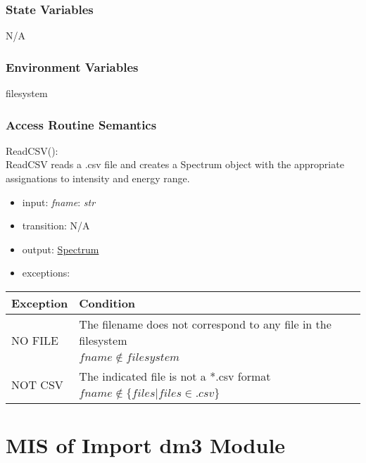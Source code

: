 \documentclass[12pt, titlepage]{article}
\begin{document}
\subsubsection{State Variables}
N/A

\subsubsection{Environment Variables}
filesystem 

\subsubsection{Access Routine Semantics}

\noindent ReadCSV():\\
ReadCSV reads a .csv file and creates a Spectrum object with the appropriate
assignations to intensity and energy range.
\begin{itemize}
    \item input: \textit{fname}: \textit{str}
    \item transition: N/A 
    \item output: \hyperref[Mod:Spectrum]{Spectrum} 
    \item exceptions:
\end{itemize}
\begin{center}
    \begin{tabular}{p{3cm} p{12cm}}
        \toprule[0.15em]
        \textbf{Exception} & \textbf{Condition}\\
        \midrule[0.1em]
        \multirow{2}{0.25\textwidth}{NO FILE} & The filename does not correspond to
        any file in the filesystem\\ 
        & $fname \notin filesystem$\\ 
        \midrule[0.05em]
        \multirow{2}{0.25\textwidth}{NOT CSV} & The indicated file is not a *.csv
        format\\
        & $fname \notin \{files|files \in .csv\}$\\ 
        \bottomrule[0.15em]
    \end{tabular}
\end{center}


\section{MIS of Import dm3 Module} \label{Mod:ImportDM3}
\end{document}
